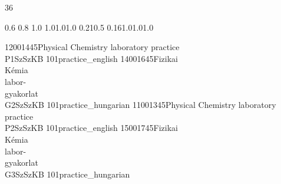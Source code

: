 \documentclass[a4paper,10pt]{report}
\begin{document}
\thispagestyle{empty}
\begin{landscape}
\noindent{}

\setslotsize{2.8cm}{0.3cm}
 {36}
\settextframe{0.8mm}



   {0.6} {0.8} {1.0} {1.0}{1.0}{1.0}
       {0.21}{0.5} {0.16}{1.0}{1.0}{1.0}

\begin{timetable}
   {1200}{1445}{Physical Chemistry laboratory practice \\ P1}{SzSzK}{B 101}{practice_english}
   {1400}{1645}{Fizikai \\ Kémia \\ labor-\\gyakorlat \\ G2}{SzSzK}{B 101}{practice_hungarian}
   {1100}{1345}{Physical Chemistry laboratory practice \\ P2}{SzSzK}{B 101}{practice_english}
   {1500}{1745}{Fizikai \\ Kémia \\ labor-\\gyakorlat \\ G3}{SzSzK}{B 101}{practice_hungarian}
\end{timetable}
\end{landscape}
\end{document}
